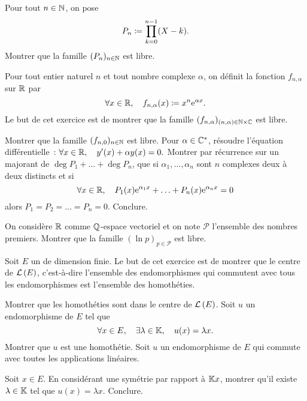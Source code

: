 \documentclass{magnolia}
\begin{document}


Pour tout $n\in\mathbb{N}$, on pose
\[P_n\coloneqq\prod_{k=0}^{n-1} (X-k).\]
Montrer que la famille $(P_n)_{n\in\mathbb{N}}$ est libre.

Pour tout entier naturel $n$ et tout nombre complexe $\alpha$, on définit la
fonction $f_{n,\alpha}$ sur $\mathbb{R}$ par
\[\forall x \in \mathbb{R} ,\quad f_{n,\alpha}(x)\coloneqq x^n {\rm e}^{\alpha x}.\]
Le but de cet exercice est de montrer que la famille
$(f_{n,\alpha})_{(n,\alpha) \in\mathbb{N}\times\mathbb{C}}$ est libre.
\begin{questions}
\question Montrer que la famille $(f_{n,0})_{n\in\mathbb{N}}$ est libre.
\question Pour $\alpha\in\mathbb{C}^*$, résoudre l'équation différentielle~:
  $\forall x \in \mathbb{R} ,\quad y'(x)+\alpha y(x)=0.$
\question Montrer par récurrence sur un majorant de
  $\deg{P_1}+\dots+\deg{P_n}$, que si $\alpha_1,\ldots,\alpha_n$ sont $n$
  complexes deux à deux distincts et si
  \[\forall x\in\mathbb{R} ,\quad P_1(x){\rm e}^{\alpha_1 x}+\ldots+P_n(x){\rm e}^{\alpha_n x}=0\]
  alors $P_1=P_2=\ldots=P_n=0$.
\question Conclure.
\end{questions}

On considère $\mathbb{R}$ comme $\mathbb{Q}$-espace vectoriel et on note $\mathcal{P}$ l'ensemble des
nombres premiers. Montrer que la famille $(\ln p)_{p\in\mathcal{P}}$ est libre.






Soit $E$ un \Kev de dimension finie. Le but de cet exercice est de montrer que
le centre de $\mathcal{L}\left(E\right)$, c'est-à-dire l'ensemble des endomorphismes qui
commutent avec tous les endomorphismes est l'ensemble des homothéties.
\begin{questions}
\question Montrer que les homothéties sont dans le centre de $\mathcal{L}\left(E\right)$.
\question Soit $u$ un endomorphisme de $E$ tel que
  \[\forall x\in E ,\quad \exists \lambda\in\mathbb{K} ,\quad  u(x)=\lambda x.\]
  Montrer que $u$ est une homothétie.
\question Soit $u$ un endomorphisme de $E$ qui commute avec toutes les
  applications linéaires.
  \begin{questions}
  \question Soit $x\in E$. En considérant une symétrie par rapport à $\mathbb{K} x$,
    montrer qu'il existe $\lambda\in\mathbb{K}$ tel que $u(x)=\lambda x$.
  \question Conclure.
  \end{questions}
\end{questions}
\end{document}
